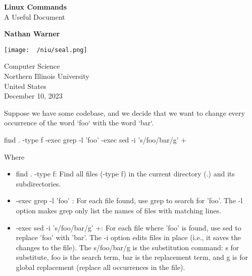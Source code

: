 \documentclass{report}
\title{\Huge{}}
\author{\huge{Nathan Warner}}
\date{\huge{}}
\begin{document}
        \begin{titlepage}
       \begin{center}
           \vspace*{1cm}
    
           \textbf{Linux Commands} \\
           A Useful Document
    
           \vspace{0.5cm}
            
                
           \vspace{1.5cm}
    
           \textbf{Nathan Warner}
    
           \vfill
                
                
           \vspace{0.8cm}
         
           \texttt{[image: ~/niu/seal.png]}
                
           Computer Science \\
           Northern Illinois University\\
           United States\\
           December 10, 2023
                
       \end{center}
    \end{titlepage}
    \tableofcontents
    \pagebreak \bigbreak \noindent 
    \bigbreak \noindent 
    Suppose we have some codebase, and we decide that we want to change every occurrence of the word `foo` with the word `bar`. 
    \begin{bashcode}
        find . -type f -exec grep -l 'foo' {} \; -exec sed -i 's/foo/bar/g' {} + 
    \end{bashcode}
    \bigbreak \noindent 
    Where
    \bigbreak \noindent 
    \begin{itemize}
        \item find . -type f: Find all files (-type f) in the current directory (.) and its subdirectories.
        \item -exec grep -l 'foo' {} \;: For each file found, use grep to search for 'foo'. The -l option makes grep only list the names of files with matching lines.
        \item -exec sed -i 's/foo/bar/g' {} +: For each file where 'foo' is found, use sed to replace 'foo' with 'bar'. The -i option edits files in place (i.e., it saves the changes to the file). The s/foo/bar/g is the substitution command: s for substitute, foo is the search term, bar is the replacement term, and g is for global replacement (replace all occurrences in the file).
    \end{itemize}
\end{document}
